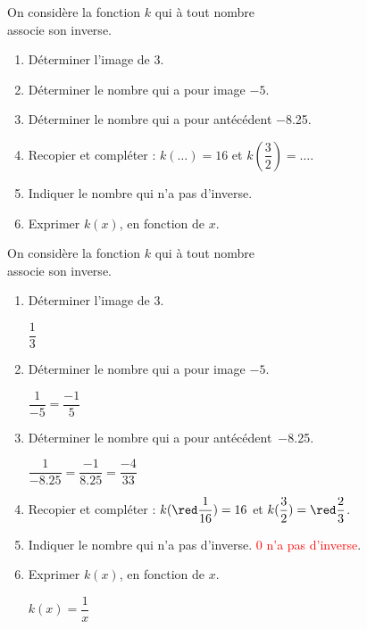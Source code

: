 \begin{exercice}
    On considère la fonction $k$ qui à tout nombre \\associe son inverse.
    \begin{enumerate}
        \item Déterminer l'image de $3$.
        \item Déterminer le nombre qui a pour image $-5$.
        \item Déterminer le nombre qui a pour antécédent \num{-8.25}.
        \item Recopier et compléter : $k(\dots{})=16$ et $k(\dfrac{3}{2})=\dots{}$.
        \item Indiquer le nombre qui n'a pas d'inverse.
        \item Exprimer $k(x)$, en fonction de $x$.
    \end{enumerate}
\end{exercice}
\begin{corrige}
    On considère la fonction $k$ qui à tout nombre \\associe son inverse.

    \begin{enumerate}
        \item Déterminer l'image de $3$.
        
        \smallskip
        {\red $\dfrac{1}{3}$}
        \smallskip
        \item Déterminer le nombre qui a pour image $-5$.
        
        \smallskip
        {\red $\dfrac{1}{-5}=\dfrac{-1}{5}$}
        \smallskip
    \end{enumerate}
    \Coupe
    \begin{enumerate}
    \setcounter{enumi}{2}
        \item Déterminer le nombre qui a pour \hbox{antécédent \num{-8.25}.}
        
        {\red $\dfrac{1}{\num{-8.25}}=\dfrac{-1}{\num{8.25}}=\dfrac{-4}{33}$}
        \item Recopier et compléter : $k({\red \dfrac{1}{16}})=16$ et $k(\dfrac{3}{2})={\red \dfrac{2}{3}}$.
        \item Indiquer le nombre qui n'a pas d'inverse. \textcolor{red}{$0$ n'a pas d'inverse}.
        \item Exprimer $k(x)$, en fonction de $x$.
        
        {\red $k(x)=\dfrac{1}{x}$}
    \end{enumerate}
\end{corrige}
